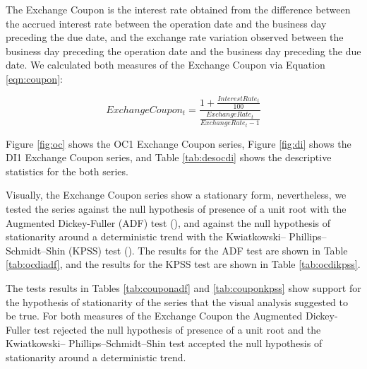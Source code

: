 \documentclass[a4paper]{article}
\begin{document}






The Exchange Coupon is the interest rate obtained from the difference between the accrued interest rate between the operation date and the business day preceding the due date, and the exchange rate variation observed between the business day preceding the operation date and the business day preceding the due date. We calculated both measures of the Exchange Coupon via Equation \ref{eqn:coupon}:

\begin{equation}
\label{eqn:coupon}
ExchangeCoupon_t = \frac{1 + \frac{InterestRate_t}{100}}{\frac{ExchangeRate_t}{ExchangeRate_t-1}}
\end{equation}

Figure \ref{fig:oc} shows the OC1 Exchange Coupon series, Figure \ref{fig:di} shows the DI1 Exchange Coupon series, and Table \ref{tab:desocdi} shows the descriptive statistics for the both series.







Visually, the Exchange Coupon series show a stationary form, nevertheless, we tested the series against the null hypothesis of presence of a unit root with the Augmented Dickey-Fuller (ADF) test (\citet{adf}), and against the null hypothesis of stationarity around a deterministic trend with the Kwiatkowski– Phillips–Schmidt–Shin (KPSS) test (\citet{kpss}). The results for the ADF test are shown in Table \ref{tab:ocdiadf}, and the results for the KPSS test are shown in Table \ref{tab:ocdikpss}.






The tests results in Tables \ref{tab:couponadf} and \ref{tab:couponkpss} show support for the hypothesis of stationarity of the series that the visual analysis suggested to be true. For both measures of the Exchange Coupon the Augmented Dickey-Fuller test rejected the null hypothesis of presence of a unit root and the Kwiatkowski– Phillips–Schmidt–Shin test accepted the null hypothesis of stationarity around a deterministic trend.
\end{document}
